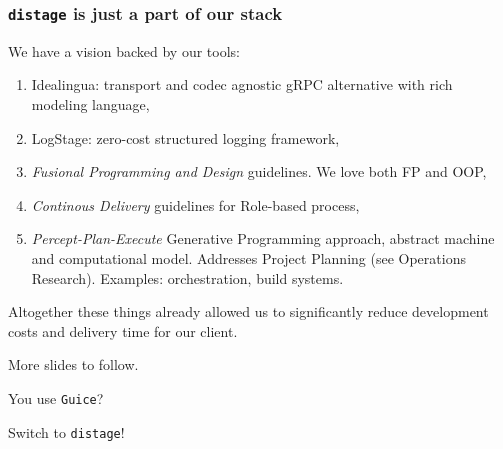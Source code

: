\documentclass[usenames,dvipsnames]{beamer}
\newcommand{\distage}{\texttt{distage}\xspace}
\begin{document}
\begin{frame}
  \frametitle{\distage is just a part of our stack}
  We have a vision backed by our tools:
  \begin{enumerate}
    \item Idealingua: transport and codec agnostic gRPC alternative with rich modeling language,
    \item LogStage: zero-cost structured logging framework,
    \item \textit{Fusional Programming and Design} guidelines. We love both FP and OOP,
    \item \textit{Continous Delivery} guidelines for Role-based process,
    \item \textit{Percept-Plan-Execute} Generative Programming approach, abstract machine and computational model.
    Addresses Project Planning (see Operations Research). Examples: orchestration, build systems.
  \end{enumerate}

  Altogether these things already allowed us to significantly reduce development costs and
  delivery time for our client.\newline

  More slides to follow.
\end{frame}

\begin{frame}
  \begin{center}
  \Huge
  You use \texttt{Guice}?

  Switch to \distage!

  \end{center}

  \newline
\end{frame}
\end{document}
